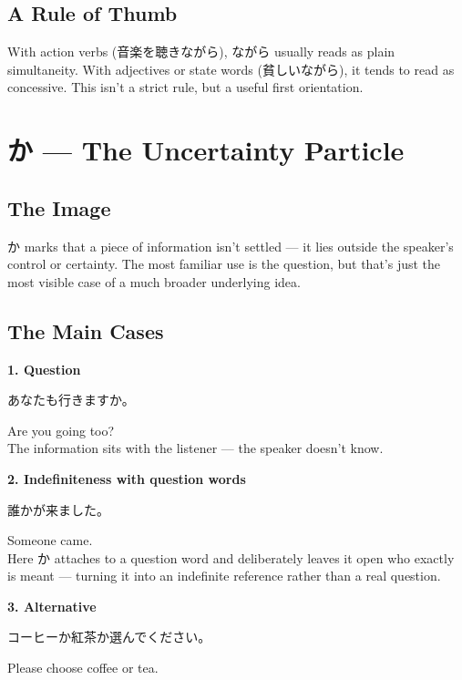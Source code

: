 \documentclass[12pt]{book}
\begin{document}
\section*{A Rule of Thumb}

With action verbs (音楽を聴きながら), ながら usually reads as plain simultaneity. With adjectives or state words (貧しいながら), it tends to read as concessive. This isn't a strict rule, but a useful first orientation.


\chapter{か — The Uncertainty Particle}

\section*{The Image}

か marks that a piece of information isn't settled — it lies outside the speaker's control or certainty. The most familiar use is the question, but that's just the most visible case of a much broader underlying idea.

\section*{The Main Cases}

\textbf{1. Question}
\par\quad あなたも行きますか。\\
\par\quad Are you going too?\\

The information sits with the listener — the speaker doesn't know.

\textbf{2. Indefiniteness with question words}
\par\quad 誰かが来ました。\\
\par\quad Someone came.\\

Here か attaches to a question word and deliberately leaves it open who exactly is meant — turning it into an indefinite reference rather than a real question.

\textbf{3. Alternative}
\par\quad コーヒーか紅茶か選んでください。\\
\par\quad Please choose coffee or tea.\\
\end{document}
